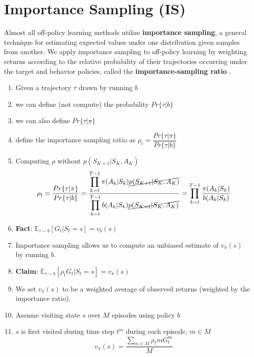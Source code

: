 \section{Importance Sampling (IS) \cite{medium/nerd-for-tech/monte-carlo-methods-for-reinforcement-learning-d30d874dd817,bits-pilani-slides}}\label{Importance Sampling (IS)}

Almost all off-policy learning methods utilize \textbf{importance sampling}, a general technique for estimating expected values under one distribution given samples from another. We apply importance sampling to off-policy learning by weighting returns according to the relative probability of their trajectories occurring under the target and behavior policies, called the \textbf{importance-sampling ratio} .

\begin{enumerate}
    \item Given a trajectory $\tau$ drawn by running $b$
    \item we can define (not compute) the probability $Pr\{\tau|b\}$
    \item we can also define $Pr\{\tau|\pi\}$
    \item define the importance sampling ratio as $\rho_t = \displaystyle\dfrac{Pr\{\tau|\pi\}}{Pr\{\tau|b\}}$
    \item Computing $\rho$ without $p(S_{K+1}|S_K,A_K)$ 
    \[
        \rho_t = \displaystyle\dfrac{Pr\{\tau|\pi\}}{Pr\{\tau|b\}} = \displaystyle\dfrac{\displaystyle\prod_{k=t}^{T-1} \pi(A_k|S_k)\cancel{p(S_{K+1}|S_K,A_K)}}{\displaystyle\prod_{k=t}^{T-1} b(A_k|S_k)\cancel{p(S_{K+1}|S_K,A_K)}} = \displaystyle\prod_{k=t}^{T-1}\displaystyle\dfrac{\pi(A_k|S_k)}{b(A_k|S_k)}
    \]
    \item \textbf{Fact}: \( \mathbb{E}_{\tau \sim b}[G_t|S_t=s]=v_b(s) \)
    \item Importance sampling allows us to compute an unbiased estimate of $v_\pi(s)$ by running $b$.
    \item \textbf{Claim}: \( \mathbb{E}_{\tau \sim b}[\rho_t G_t|S_t=s]=v_\pi(s) \)
    \item We set $v_\pi(s)$ to be a weighted average of observed returns (weighted by the importance ratio).
    \item Assume visiting state $s$ over $M$ episodes using policy $b$
    \item $s$ is first visited during time step $t^m$ during each episode, $m\in M$
    \[
        v_\pi(s) = \displaystyle\dfrac{\displaystyle\sum_{m\in M} \rho_t m G_t^m}{M}
    \]
\end{enumerate}


